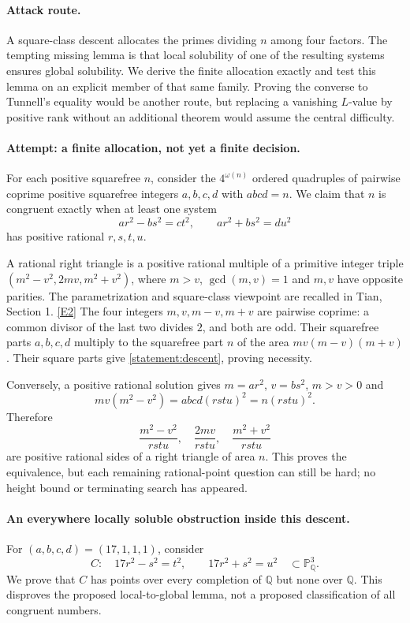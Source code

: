 \documentclass[11pt,a4paper]{article}
\newcommand{\Q}{\mathbb{Q}}
\newcommand{\PP}{\mathbb P}
\newcommand{\eref}[2]{\hyperlink{extra:#1:#2}{[E#2]}}
\numberwithin{equation}{section}
\begin{document}
\paragraph{Attack route.}
A square-class descent allocates the primes dividing $n$ among four factors.
The tempting missing lemma is that local solubility of one of the resulting
systems ensures global solubility. We derive the finite allocation exactly
and test this lemma on an explicit member of that same family. Proving the
converse to Tunnell's equality would be another route, but replacing a
vanishing $L$-value by positive rank without an additional theorem would
assume the central difficulty.

\paragraph{Attempt: a finite allocation, not yet a finite decision.}
For each positive squarefree $n$, consider the $4^{\omega(n)}$ ordered
quadruples of pairwise coprime positive squarefree integers $a,b,c,d$ with
$abcd=n$. We claim that $n$ is congruent exactly when at least one system
\begin{equation}\label{statement:descent}
 ar^2-bs^2=ct^2,\qquad ar^2+bs^2=du^2
\end{equation}
has positive rational $r,s,t,u$.

A rational right triangle is a positive rational multiple of a primitive
integer triple $(m^2-v^2,2mv,m^2+v^2)$, where $m>v$, $\gcd(m,v)=1$ and
$m,v$ have opposite parities. The parametrization and square-class viewpoint
are recalled in Tian, Section 1. \eref{statement}{2} The four integers
$m,v,m-v,m+v$ are pairwise coprime: a common divisor of the last two divides
$2$, and both are odd. Their squarefree parts $a,b,c,d$ multiply to the
squarefree part $n$ of the area $mv(m-v)(m+v)$. Their square parts give
\eqref{statement:descent}, proving necessity.

Conversely, a positive rational solution gives $m=ar^2$, $v=bs^2$, $m>v>0$
and
\[
 mv(m^2-v^2)=abcd(rstu)^2=n(rstu)^2.
\]
Therefore
\begin{equation}\label{statement:triangle}
 \frac{m^2-v^2}{rstu},\quad \frac{2mv}{rstu},\quad
 \frac{m^2+v^2}{rstu}
\end{equation}
are positive rational sides of a right triangle of area $n$. This proves
the equivalence, but each remaining rational-point question can still be
hard; no height bound or terminating search has appeared.

\paragraph{An everywhere locally soluble obstruction inside this descent.}
For $(a,b,c,d)=(17,1,1,1)$, consider
\begin{equation}\label{statement:C}
 C:\quad 17r^2-s^2=t^2,\qquad17r^2+s^2=u^2
 \quad\subset\PP^3_{\Q}.
\end{equation}
We prove that $C$ has points over every completion of $\Q$ but none over
$\Q$. This disproves the proposed local-to-global lemma, not a proposed
classification of all congruent numbers.
\end{document}
